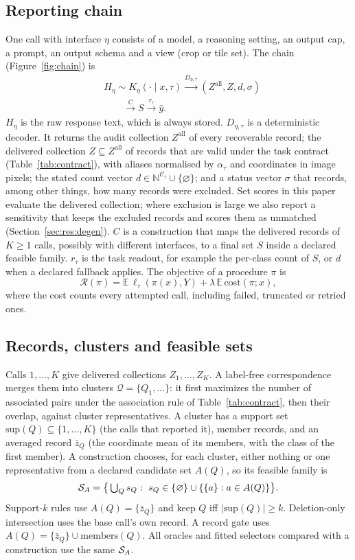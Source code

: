 \subsection{Reporting chain}
One call with interface $\eta$ consists of a model, a reasoning setting, an output cap, a prompt, an output schema and a view (crop or tile set). The chain (Figure~\ref{fig:chain}) is
\begin{align*}
&H_\eta\sim K_\eta(\cdot\mid x,\tau)\xrightarrow{D_{\eta,\tau}}(Z^{\mathrm{all}},Z,d,\sigma)\\
&\qquad\xrightarrow{C}S\xrightarrow{r_\tau}\hat y.
\end{align*}
$H_\eta$ is the raw response text, which is always stored. $D_{\eta,\tau}$ is a deterministic decoder. It returns the audit collection $Z^{\mathrm{all}}$ of every recoverable record; the delivered collection $Z\subseteq Z^{\mathrm{all}}$ of records that are valid under the task contract (Table~\ref{tab:contract}), with aliases normalised by $\alpha_\tau$ and coordinates in image pixels; the stated count vector $d\in\mathbb{N}^{\mathcal{C}_\tau}\cup\{\varnothing\}$; and a status vector $\sigma$ that records, among other things, how many records were excluded. Set scores in this paper evaluate the delivered collection; where exclusion is large we also report a sensitivity that keeps the excluded records and scores them as unmatched (Section~\ref{sec:res:degen}). $C$ is a construction that maps the delivered records of $K\ge1$ calls, possibly with different interfaces, to a final set $S$ inside a declared feasible family. $r_\tau$ is the task readout, for example the per-class count of $S$, or $d$ when a declared fallback applies. The objective of a procedure $\pi$ is
\[
\mathcal{R}(\pi)=\mathbb{E}\,\ell_\tau(\pi(x),Y)+\lambda\,\mathbb{E}\,\mathrm{cost}(\pi;x),
\]
where the cost counts every attempted call, including failed, truncated or retried ones.

\subsection{Records, clusters and feasible sets}\label{sec:setup:feasible}
Calls $1,\dots,K$ give delivered collections $Z_1,\dots,Z_K$. A label-free correspondence merges them into clusters $\mathcal{Q}=\{Q_1,\dots\}$: it first maximizes the number of associated pairs under the association rule of Table~\ref{tab:contract}, then their overlap, against cluster representatives. A cluster has a support set $\mathrm{sup}(Q)\subseteq\{1,\dots,K\}$ (the calls that reported it), member records, and an averaged record $\bar z_Q$ (the coordinate mean of its members, with the class of the first member). A construction chooses, for each cluster, either nothing or one representative from a declared candidate set $A(Q)$, so its feasible family is
\[
\SA=\big\{\textstyle\bigcup_Q s_Q:\ s_Q\in\{\varnothing\}\cup\{\{a\}:a\in A(Q)\}\big\}.
\]
Support-$k$ rules use $A(Q)=\{\bar z_Q\}$ and keep $Q$ iff $|\mathrm{sup}(Q)|\ge k$. Deletion-only intersection uses the base call's own record. A record gate uses $A(Q)=\{\bar z_Q\}\cup\mathrm{members}(Q)$. All oracles and fitted selectors compared with a construction use the same $\mathcal{S}_A$.

